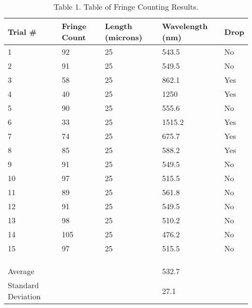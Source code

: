 \documentclass{article}
\begin{document}
\begin{table}[!ht]
\centering
\captionsetup{labelformat=empty}
\caption*{Table 1. Table of Fringe Counting Results.}
\begin{tabular}{lllll}
\centering
Trial \#           & Fringe Count & Length (microns) & Wavelength (nm) & Drop  \\
\hline
1                  & 92           & 25               & 543.5     & No    \\
\hline
2                  & 91           & 25               & 549.5     & No    \\
\hline
3                  & 58           & 25               & 862.1     & Yes   \\
\hline
4                  & 40           & 25               & 1250            & Yes   \\
\hline
5                  & 90           & 25               & 555.6     & No    \\
\hline
6                  & 33           & 25               & 1515.2     & Yes   \\
\hline
7                  & 74           & 25               & 675.7     & Yes   \\
\hline
8                  & 85           & 25               & 588.2     & Yes   \\
\hline
9                  & 91           & 25               & 549.5     & No    \\
\hline
10                 & 97           & 25               & 515.5     & No    \\
\hline
11                 & 89           & 25               & 561.8     & No    \\
\hline
12                 & 91           & 25               & 549.5     & No    \\
\hline
13                 & 98           & 25               & 510.2     & No    \\
\hline
14                 & 105          & 25               & 476.2     & No    \\
\hline
15                 & 97           & 25               & 515.5     & No    \\
                   &              &                  &                 &       \\
                   &              &                  &                 &       \\
                   &              &                  &                 &       \\
Average            &              &                  & 532.7      &       \\
\hline
Standard Deviation &              &                  & 27.1     &
\end{tabular}
\end{table}
\end{document}
